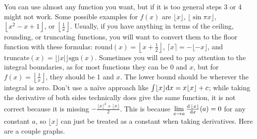 \documentclass[12pt]{article}
\begin{document}
	\indent\indent You can use almost any function you want, but if it is too general steps 3 or 4 might not
	work. Some possible examples for $f(x)$ are $\lfloor x\rfloor$, $\lfloor\sin\pi x\rfloor$,
	$\left\lfloor x^2 - x + 1\right\rfloor$, or $\left\lfloor\frac 1x\right\rfloor$. Usually, if you have
	anything in terms of the ceiling, rounding, or truncating functions, you will want to convert them to the
	floor function with these formulas: $\text{round}(x)=\left\lfloor x+\frac12\right\rfloor$,
	$\lceil x\rceil=-\lfloor-x\rfloor$, and $\text{truncate}(x)=\lfloor|x|\rfloor\text{sgn}(x)$. Sometimes you
	will need to pay attention to the integral boundaries, as for most functions they can be 0 and $x$, but for
	$f(x)=\left\lfloor\frac 1x\right\rfloor$, they should be 1 and $x$. The lower bound should be wherever the
	integral is zero. Don't use a naïve approach like $\int\lfloor x\rfloor\text dx=x\lfloor x\rfloor+c$; while
	taking the derivative of both sides technically does give the same function, it is not correct because it is
	missing $-\frac{\lfloor x\rfloor^2+\lfloor x\rfloor}2$. This is because
	$\displaystyle\lim_{x\to a}\tfrac{\text d\,\lfloor x\rfloor}{\text dx}(a)=0$ for any constant $a$, so
	$\lfloor x\rfloor$ can just be treated as a constant when taking derivatives. Here are a couple graphs.
\end{document}
